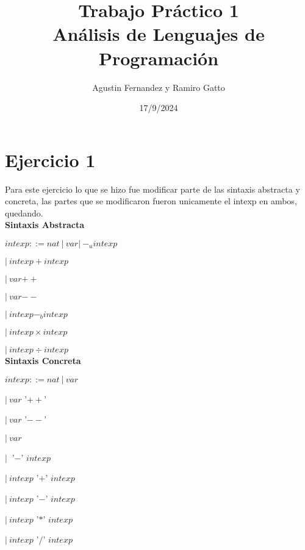 \documentclass[12pt, titlepage]{article}
\title{Trabajo Práctico 1\\ 
Análisis de Lenguajes de Programación}
\author{Agustin Fernandez y Ramiro Gatto}
\date{17/9/2024}
\begin{document}
\maketitle

\section{Ejercicio 1}
Para este ejercicio lo que se hizo fue modificar parte de las sintaxis 
abstracta y concreta, las partes que se modificaron fueron unicamente el 
intexp en ambos, quedando.\\

\noindent \textbf{Sintaxis Abstracta}

$intexp ::= nat \: | \: var | \: -_u intexp$

\hspace{1.5cm}$|\: intexp +intexp$

\hspace{1.5cm}$|\: var \mathrel{+{+}}$

\hspace{1.5cm}$|\: var \mathrel{-{-}}$

\hspace{1.5cm}$|\: intexp -_b intexp$

\hspace{1.5cm}$|\: intexp \times intexp$

\hspace{1.5cm}$|\: intexp \div  intexp $\\

\noindent \textbf{Sintaxis Concreta}

$intexp ::= nat \:|\: var$

\hspace{1.5cm}$|\: var $ '$++$'

\hspace{1.5cm}$|\: var $ '$--$'

\hspace{1.5cm}$|\: var$

\hspace{1.5cm}$|\:$ '$-$' $intexp$

\hspace{1.5cm}$|\: intexp$ '$+$' $intexp$

\hspace{1.5cm}$|\: intexp$ '$-$' $intexp$

\hspace{1.5cm}$|\: intexp$ '$*$' $intexp$

\hspace{1.5cm}$|\: intexp$ '$/$' $intexp$
\end{document}
